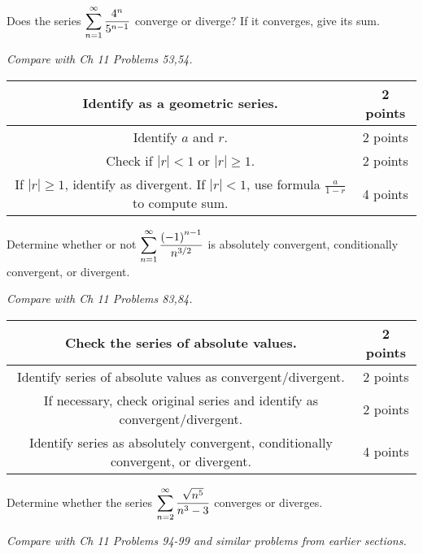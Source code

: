 \documentclass[12pt]{exam}
\newcommand{\ds}{\ensuremath{\displaystyle}}
\begin{document}
\begin{questions}
\vfill

\newpage

\question[10]
Does the series $\ds \sum_{n=1}^\infty \frac{4^n}{5^{n-1}}$ converge or
diverge? If it converges, give its sum.

\textit{Compare with Ch 11 Problems 53,54.}

\begin{center}
  \begin{tabular}{|c|c|}
    \hline
    Identify as a geometric series. & 2 points \\
    \hline
    Identify $a$ and $r$. & 2 points \\
    \hline
    Check if $|r|<1$ or $|r|\geq 1$. & 2 points \\
    \hline
    If $|r|\geq 1$, identify as divergent.
    If $|r|<1$, use formula $\frac{a}{1-r}$ to compute sum. & 4 points \\
    \hline
  \end{tabular}
\end{center}

\vfill

\newpage

\question[10]
Determine whether or not
$\ds \sum_{n=1}^{\infty} \frac{\left(-1\right)^{n-1}}{n^{3/2}}$
is absolutely convergent, conditionally convergent, or divergent.

\textit{Compare with Ch 11 Problems 83,84.}

\begin{center}
  \begin{tabular}{|c|c|}
    \hline
    Check the series of absolute values. & 2 points \\
    \hline
    Identify series of absolute values as convergent/divergent. & 2 points \\
    \hline
    If necessary, check original series and identify as
    convergent/divergent. & 2 points \\
    \hline
    Identify series as absolutely convergent, conditionally convergent,
    or divergent. & 4 points \\
    \hline
  \end{tabular}
\end{center}

\vfill

\newpage

\question[10]\label{convergenceRoundUp}
Determine whether the series
$\ds \sum_{n = 2}^{\infty} \frac{\sqrt{n^5}}{n^3-3}$
converges or diverges.

\textit{Compare with Ch 11 Problems 94-99 and similar problems from earlier
sections.}


\end{questions}
\end{document}
